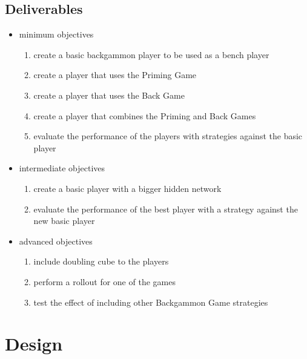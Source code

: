 \documentclass[12pt,a4paper]{article}
\begin{document}
\subsection{Deliverables}
\begin{itemize}
    \item minimum objectives
    \begin{enumerate}
    \item create a basic backgammon player to be used as a bench player 
    \item create a player that uses the Priming Game 
    \item create a player that uses the Back Game
    \item create a player that combines the Priming and Back Games
    \item evaluate the performance of the players with strategies against the basic player
    \end{enumerate}
    \item intermediate objectives
    \begin{enumerate}
    \item create a basic player with a bigger hidden network  
    \item evaluate the performance of the best player with a strategy against the new basic player
    \end{enumerate}
    \item advanced objectives
    \begin{enumerate}
    \item include doubling cube to the players  
    \item perform a rollout for one of the games
    \item test the effect of including other Backgammon Game strategies
    \end{enumerate}
    \end{itemize}
\section{Design}
\end{document}
